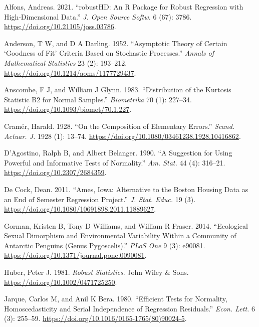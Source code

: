 \documentclass[
  a4paper,
]{article}
\newlength{\cslhangindent}
\newenvironment{CSLReferences}[2] %
 {\begin{list}{}{%
  \setlength{\itemindent}{0pt}
  \setlength{\leftmargin}{0pt}
  \setlength{\parsep}{0pt}
  \ifodd #1
   \setlength{\leftmargin}{\cslhangindent}
   \setlength{\itemindent}{-1\cslhangindent}
  \fi
  \setlength{\itemsep}{#2\baselineskip}}}
 {\end{list}}
\begin{document}
\label{refs}
\begin{CSLReferences}{1}{0}
Alfons, Andreas. 2021. {``{robustHD}: An {R} Package for Robust
Regression with High-Dimensional Data.''} \emph{J. Open Source Softw.} 6
(67): 3786. \url{https://doi.org/10.21105/joss.03786}.

Anderson, T W, and D A Darling. 1952. {``Asymptotic Theory of Certain
{`Goodness of Fit'} Criteria Based on Stochastic Processes.''}
\emph{Annals of Mathematical Statistics} 23 (2): 193--212.
\url{https://doi.org/10.1214/aoms/1177729437}.

Anscombe, F J, and William J Glynn. 1983. {``Distribution of the
Kurtosis Statistic B2 for Normal Samples.''} \emph{Biometrika} 70 (1):
227--34. \url{https://doi.org/10.1093/biomet/70.1.227}.

Cramér, Harald. 1928. {``On the Composition of Elementary Errors.''}
\emph{Scand. Actuar. J.} 1928 (1): 13--74.
\url{https://doi.org/10.1080/03461238.1928.10416862}.

D'Agostino, Ralph B, and Albert Belanger. 1990. {``A Suggestion for
Using Powerful and Informative Tests of Normality.''} \emph{Am. Stat.}
44 (4): 316--21. \url{https://doi.org/10.2307/2684359}.

De Cock, Dean. 2011. {``Ames, Iowa: Alternative to the Boston Housing
Data as an End of Semester Regression Project.''} \emph{J. Stat. Educ.}
19 (3). \url{https://doi.org/10.1080/10691898.2011.11889627}.

Gorman, Kristen B, Tony D Williams, and William R Fraser. 2014.
{``Ecological Sexual Dimorphism and Environmental Variability Within a
Community of Antarctic Penguins (Genus Pygoscelis).''} \emph{PLoS One} 9
(3): e90081. \url{https://doi.org/10.1371/journal.pone.0090081}.

Huber, Peter J. 1981. \emph{Robust Statistics}. John Wiley \& Sons.
\url{https://doi.org/10.1002/0471725250}.

Jarque, Carlos M, and Anil K Bera. 1980. {``Efficient Tests for
Normality, Homoscedasticity and Serial Independence of Regression
Residuals.''} \emph{Econ. Lett.} 6 (3): 255--59.
\url{https://doi.org/10.1016/0165-1765(80)90024-5}.


\end{CSLReferences}
\end{document}
